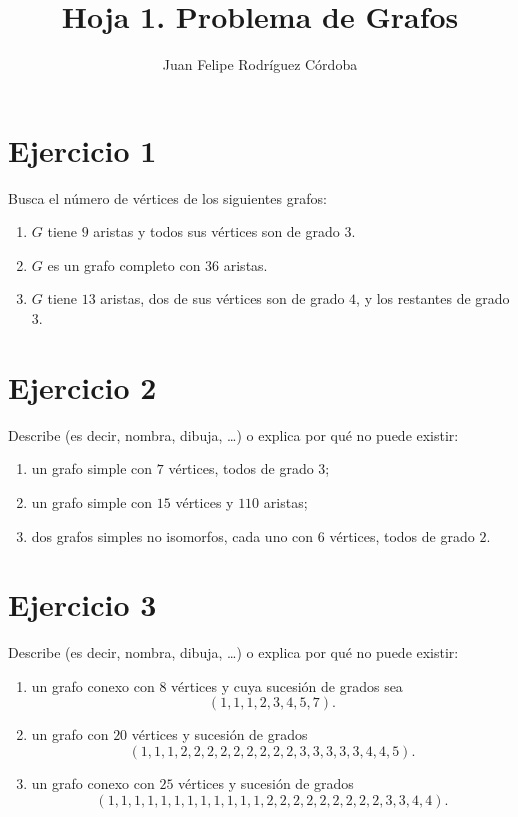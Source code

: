 \documentclass[12pt]{article}
\title{Hoja 1. Problema de Grafos}
\author{Juan Felipe Rodríguez Córdoba}
\date{}
\begin{document}
\maketitle
\section*{Ejercicio 1}

Busca el número de vértices de los siguientes grafos:
\begin{enumerate}
    \item $G$ tiene $9$ aristas y todos sus vértices son de grado $3$.
    \item $G$ es un grafo completo con $36$ aristas.
    \item $G$ tiene $13$ aristas, dos de sus vértices son de grado $4$, y los restantes de grado $3$.
\end{enumerate}

\section*{Ejercicio 2}
Describe (es decir, nombra, dibuja, \dots) o explica por qué no puede existir:
\begin{enumerate}
    \item un grafo simple con $7$ vértices, todos de grado $3$;
    \item un grafo simple con $15$ vértices y $110$ aristas;
    \item dos grafos simples no isomorfos, cada uno con $6$ vértices, todos de grado $2$.
\end{enumerate}

\section*{Ejercicio 3}
Describe (es decir, nombra, dibuja, \dots) o explica por qué no puede existir:
\begin{enumerate}
    \item un grafo conexo con $8$ vértices y cuya sucesión de grados sea
    \[
    (1,1,1,2,3,4,5,7).
    \]

    \item un grafo con $20$ vértices y sucesión de grados
    \[
    (1,1,1,2,2,2,2,2,2,2,2,2,3,3,3,3,3,4,4,5).
    \]

    \item un grafo conexo con $25$ vértices y sucesión de grados
    \[
    (1,1,1,1,1,1,1,1,1,1,1,1,2,2,2,2,2,2,2,2,2,3,3,4,4).
    \]
\end{enumerate}
\end{document}
